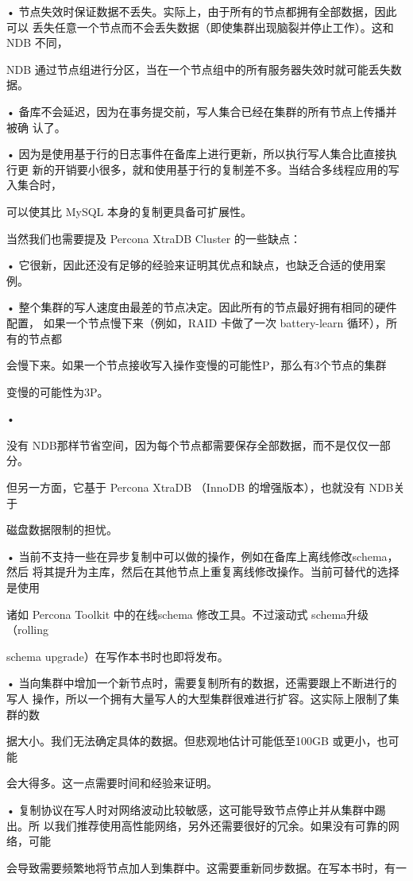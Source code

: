 • 节点失效时保证数据不丢失。实际上，由于所有的节点都拥有全部数据，因此可以
丢失任意一个节点而不会丢失数据（即使集群出现脑裂并停止工作）。这和NDB 不同，

NDB 通过节点组进行分区，当在一个节点组中的所有服务器失效时就可能丢失数据。

• 备库不会延迟，因为在事务提交前，写人集合已经在集群的所有节点上传播并被确
认了。

• 因为是使用基于行的日志事件在备库上进行更新，所以执行写人集合比直接执行更
新的开销要小很多，就和使用基于行的复制差不多。当结合多线程应用的写入集合时，

可以使其比 MySQL 本身的复制更具备可扩展性。

当然我们也需要提及 Percona XtraDB Cluster 的一些缺点：

• 它很新，因此还没有足够的经验来证明其优点和缺点，也缺乏合适的使用案例。

• 整个集群的写人速度由最差的节点决定。因此所有的节点最好拥有相同的硬件配置，
如果一个节点慢下来（例如，RAID 卡做了一次 battery-learn 循环），所有的节点都

会慢下来。如果一个节点接收写入操作变慢的可能性P，那么有3个节点的集群

变慢的可能性为3P。

•

没有 NDB那样节省空间，因为每个节点都需要保存全部数据，而不是仅仅一部分。

但另一方面，它基于 Percona XtraDB （InnoDB 的增强版本），也就没有 NDB关于

磁盘数据限制的担忧。

• 当前不支持一些在异步复制中可以做的操作，例如在备库上离线修改schema，然后
将其提升为主库，然后在其他节点上重复离线修改操作。当前可替代的选择是使用

诸如 Percona Toolkit 中的在线schema 修改工具。不过滚动式 schema升级 （rolling

schema upgrade）在写作本书时也即将发布。

• 当向集群中增加一个新节点时，需要复制所有的数据，还需要跟上不断进行的写人
操作，所以一个拥有大量写人的大型集群很难进行扩容。这实际上限制了集群的数

据大小。我们无法确定具体的数据。但悲观地估计可能低至100GB 或更小，也可能

会大得多。这一点需要时间和经验来证明。

• 复制协议在写人时对网络波动比较敏感，这可能导致节点停止并从集群中踢出。所
以我们推荐使用高性能网络，另外还需要很好的冗余。如果没有可靠的网络，可能

会导致需要频繁地将节点加人到集群中。这需要重新同步数据。在写本书时，有一

